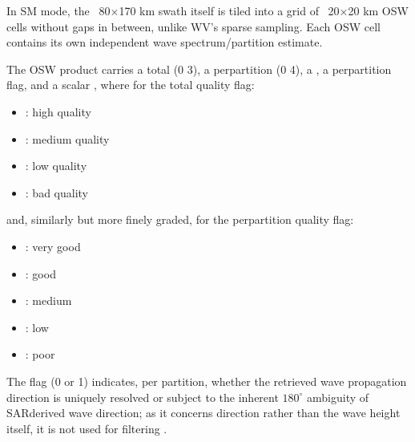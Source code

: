 \documentclass[a4paper,10pt,english]{sphinxmanual}
\begin{document}
\sphinxAtStartPar
In SM mode, the  80×170 km swath itself is tiled into a grid of  20×20 km OSW cells without gaps in between, unlike WV’s sparse sampling. Each OSW cell contains its own independent wave spectrum/partition estimate.

\sphinxAtStartPar
{}

\sphinxAtStartPar
The OSW product carries a total  (0 \textendash{} 3), a per\sphinxhyphen{}partition  (0 \textendash{} 4), a , a per\sphinxhyphen{}partition  flag, and a scalar , where for the total quality flag:
\begin{itemize}
\item {} 
: high quality

\item {} 
: medium quality

\item {} 
: low quality

\item {} 
: bad quality

\end{itemize}

\sphinxAtStartPar
and, similarly but more finely graded, for the per\sphinxhyphen{}partition quality flag:
\begin{itemize}
\item {} 
: very good

\item {} 
: good

\item {} 
: medium

\item {} 
: low

\item {} 
: poor

\end{itemize}

\sphinxAtStartPar
The  flag (0 or 1) indicates, per partition, whether the retrieved wave propagation direction is uniquely resolved or subject to the inherent \(180^\circ\) ambiguity of SAR\sphinxhyphen{}derived wave direction; as it concerns direction rather than the wave height itself, it is not used for filtering .
\end{document}

